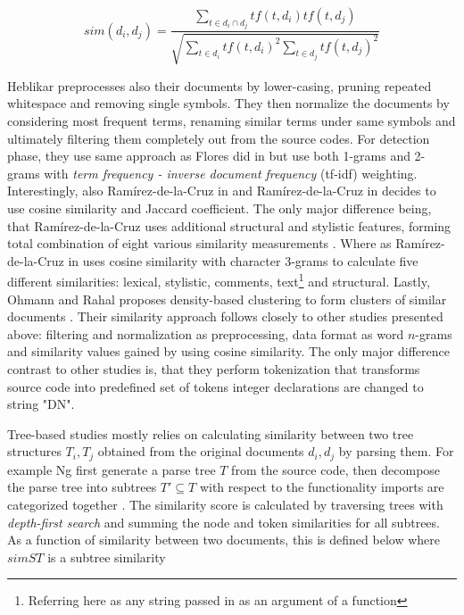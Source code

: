 \begin{equation}
    sim(d_i, d_j) = \dfrac{\sum\limits_{t \in d_i \cap d_j} tf(t, d_i) tf(t, d_j) }
                          {\sqrt{\sum\limits_{t \in d_i} tf(t, d_i)^2 \sum\limits_{t \in d_j} tf(t, d_j)^2}}
\end{equation}

\noindent
Heblikar \etal \cite{Heblikar2015NormalizationBS} preprocesses also their documents by lower-casing, pruning repeated whitespace and removing single symbols. They then normalize the documents by considering most frequent terms, renaming similar terms under same symbols and ultimately filtering them completely out from the source codes. For detection phase, they use same approach as Flores \etal did in \cite{USCR2014} but use both 1-grams and 2-grams with \emph{term frequency - inverse document frequency} (tf-idf) weighting. Interestingly, also Ramírez-de-la-Cruz \etal in \cite{OTIOLSS2015} and Ramírez-de-la-Cruz \etal in \cite{ramirez2015high} decides to use cosine similarity and Jaccard coefficient. The only major difference being, that Ramírez-de-la-Cruz \etal uses additional structural and stylistic features, forming total combination of eight various similarity measurements \cite{OTIOLSS2015}. Where as Ramírez-de-la-Cruz \etal in \cite{ramirez2015high} uses cosine similarity with character 3-grams to calculate five different similarities: lexical, stylistic, comments, text\footnote{Referring here as any string passed in as an argument of a function} and structural. Lastly, Ohmann and Rahal proposes density-based clustering to form clusters of similar documents \cite{Ohmann2015}. Their similarity approach follows closely to other studies presented above: filtering and normalization as preprocessing, data format as word $n$-grams and similarity values gained by using cosine similarity. The only major difference contrast to other studies is, that they perform tokenization that transforms source code into predefined set of tokens \eg integer declarations are changed to string "DN".

Tree-based studies mostly relies on calculating similarity between two tree structures $T_i, T_j$ obtained from the original documents $d_i, d_j$ by parsing them. For example Ng \etal first generate a parse tree $T$ from the source code, then decompose the parse tree into subtrees $T' \subseteq T$ with respect to the functionality \eg imports are categorized together \cite{TBCFPD2012}. The similarity score is calculated by traversing trees with \emph{depth-first search} and summing the node and token similarities for all subtrees. As a function of similarity between two documents, this is defined below where $simST$ is a subtree similarity

